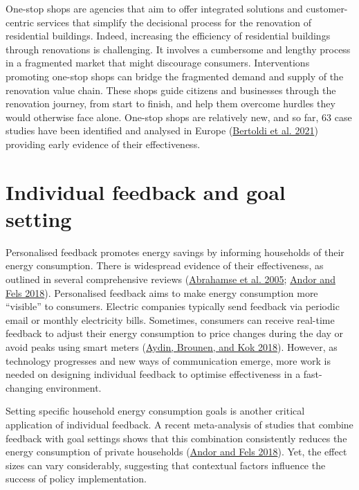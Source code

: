 \documentclass[
  11pt,
  captions=heading]{scrreport}
\begin{document}
One-stop shops are agencies that aim to offer integrated solutions and
customer-centric services that simplify the decisional process for the
renovation of residential buildings. Indeed, increasing the efficiency
of residential buildings through renovations is challenging. It involves
a cumbersome and lengthy process in a fragmented market that might
discourage consumers. Interventions promoting one-stop shops can bridge
the fragmented demand and supply of the renovation value chain. These
shops guide citizens and businesses through the renovation journey, from
start to finish, and help them overcome hurdles they would otherwise
face alone. One-stop shops are relatively new, and so far, 63 case
studies have been identified and analysed in Europe
(\protect\hyperlink{ref-bertoldi2021role}{Bertoldi et al. 2021})
providing early evidence of their effectiveness.

\hypertarget{individual-feedback-and-goal-setting}{%
\section{Individual feedback and goal
setting}\label{individual-feedback-and-goal-setting}}

Personalised feedback promotes energy savings by informing households of
their energy consumption. There is widespread evidence of their
effectiveness, as outlined in several comprehensive reviews
(\protect\hyperlink{ref-abrahamse2005review}{Abrahamse et al. 2005};
\protect\hyperlink{ref-andor2018behavioral}{Andor and Fels 2018}).
Personalised feedback aims to make energy consumption more ``visible''
to consumers. Electric companies typically send feedback via periodic
email or monthly electricity bills. Sometimes, consumers can receive
real-time feedback to adjust their energy consumption to price changes
during the day or avoid peaks using smart meters
(\protect\hyperlink{ref-aydin2018information}{Aydin, Brounen, and Kok
2018}). However, as technology progresses and new ways of communication
emerge, more work is needed on designing individual feedback to optimise
effectiveness in a fast-changing environment.

Setting specific household energy consumption goals is another critical
application of individual feedback. A recent meta-analysis of studies
that combine feedback with goal settings shows that this combination
consistently reduces the energy consumption of private households
(\protect\hyperlink{ref-andor2018behavioral}{Andor and Fels 2018}). Yet,
the effect sizes can vary considerably, suggesting that contextual
factors influence the success of policy implementation.
\end{document}
